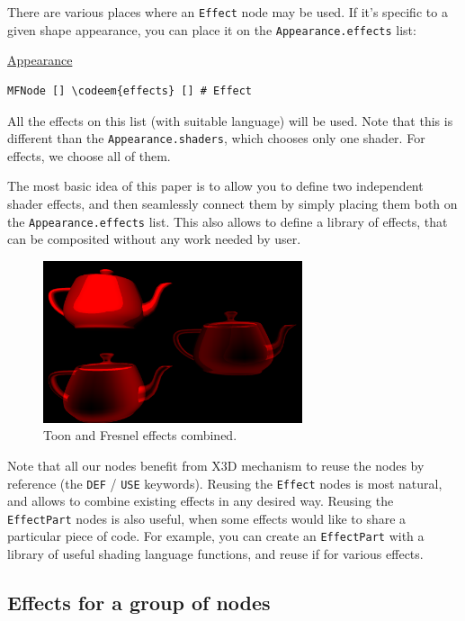 \documentclass{acmsiggraph}                     %
\newenvironment{mycode}
{\begin{mycodecore}}
{\end{mycodecore}
\vspace{-0.1in}}
\newcommand*{\codeem}[1]{\textbf{#1}}
\begin{document}
There are various places where an \texttt{Effect} node may be used.
If it's specific to a given shape appearance, you can place it
on the \texttt{Appearance.effects} list:

\begin{mycode}
\underline{Appearance}
\begin{Verbatim}[commandchars=\\\{\}]
MFNode [] \codeem{effects} [] # Effect
\end{Verbatim}
\end{mycode}

All the effects on this list (with suitable language) will be used.
Note that this is different
than the \texttt{Appearance.shaders}, which chooses only one shader.
For effects, we choose all of them.

The most basic idea of this paper is to allow you to define two
independent shader effects, and then seamlessly connect them by simply
placing them both on the \texttt{Appearance.effects} list. This also allows to
define a library of effects, that can be composited without any work
needed by user.

\begin{figure}[H]
  \centering
  \includegraphics[width=3in]{fresnel_and_toon}
  \caption{Toon and Fresnel effects combined.}
\end{figure}

Note that all our nodes benefit from X3D mechanism to reuse the nodes
by reference (the \texttt{DEF} / \texttt{USE} keywords). Reusing the
\texttt{Effect} nodes
is most natural, and allows to combine existing effects in any desired way.
Reusing the \texttt{EffectPart} nodes is also useful, when some effects
would like to share a particular piece of code. For example,
you can create an \texttt{EffectPart} with a library of useful
shading language functions, and reuse if for various effects.

\subsection{Effects for a group of nodes}
\end{document}
